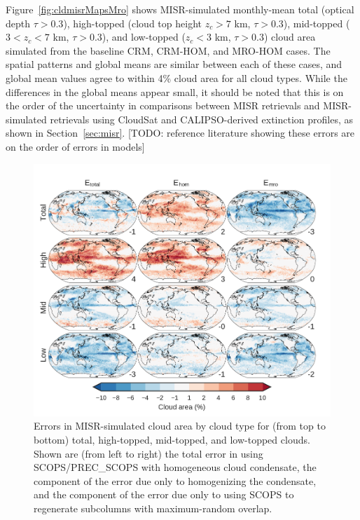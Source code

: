 Figure~\ref{fig:cldmisrMapsMro} shows MISR-simulated monthly-mean total
(optical depth \(\tau > 0.3\)), high-topped (cloud top height
\(z_c > 7\) km, \(\tau > 0.3\)), mid-topped (\(3 < z_c < 7\) km,
\(\tau > 0.3\)), and low-topped (\(z_c < 3\) km, \(\tau > 0.3\)) cloud
area simulated from the baseline CRM, CRM-HOM, and MRO-HOM cases. The
spatial patterns and global means are similar between each of these
cases, and global mean values agree to within 4\% cloud area for all
cloud types. While the differences in the global means appear small, it
should be noted that this is on the order of the uncertainty in
comparisons between MISR retrievals and MISR-simulated retrievals using
CloudSat and CALIPSO-derived extinction profiles, as shown in
Section~\ref{sec:misr}. {[}TODO: reference literature showing these
errors are on the order of errors in models{]}

\begin{figure}[htbp]
\centering
\includegraphics{graphics/subgrid1_cldmisr_maps_diff.pdf}
\caption{\label{fig:cldmisrMapsMroDiff}Errors in MISR-simulated cloud
area by cloud type for (from top to bottom) total, high-topped,
mid-topped, and low-topped clouds. Shown are (from left to right) the
total error in using SCOPS/PREC\_SCOPS with homogeneous cloud
condensate, the component of the error due only to homogenizing the
condensate, and the component of the error due only to using SCOPS to
regenerate subcolumns with maximum-random
overlap.}\label{fig:cldmisrMapsMroDiff}
\end{figure}

